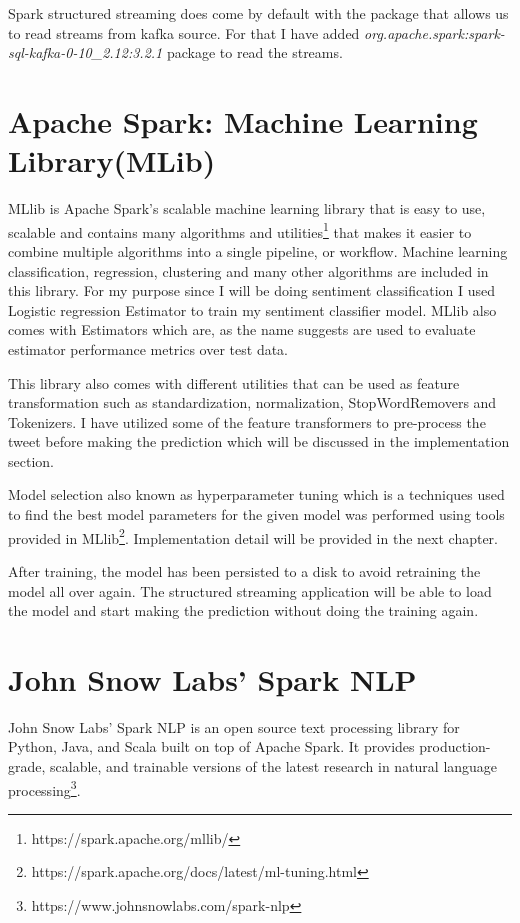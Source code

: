 \documentclass[12pt,a4paper]{report}
\begin{document}
Spark structured streaming does come by default with the package that allows us to read streams from kafka source. For that I have added \textit{org.apache.spark:spark-sql-kafka-0-10\_2.12:3.2.1} package to read the streams.
\section{Apache Spark: Machine Learning Library(MLib)}
MLlib is Apache Spark's scalable machine learning library that is easy to use, scalable and contains many algorithms and utilities\footnote{https://spark.apache.org/mllib/} that makes it easier to combine multiple algorithms into a single pipeline, or workflow. Machine learning classification, regression, clustering and many other algorithms are included in this library. For my purpose since I will be doing sentiment classification I used Logistic regression Estimator to train my sentiment classifier model. MLlib also comes with Estimators which are, as the name suggests are used to evaluate estimator performance metrics over test data.

This library also comes with different utilities that can be used as feature transformation such as standardization, normalization, StopWordRemovers and Tokenizers. I have utilized some of the feature transformers to pre-process the tweet before making the prediction which will be discussed in the implementation section.

Model selection also known as hyperparameter tuning which is a techniques used to find the best model parameters for the given model was performed using tools provided in MLlib\footnote{https://spark.apache.org/docs/latest/ml-tuning.html}. Implementation detail will be provided in the next chapter.

After training, the model has been persisted to a disk to avoid retraining the model all over again. The structured streaming application will be able to load the model and start making the prediction without doing the training again.

\section{John Snow Labs' Spark NLP}

John Snow Labs' Spark NLP is an open source text processing library for Python, Java, and Scala built on top of Apache Spark. It provides production-grade, scalable, and trainable versions of the latest research in natural language processing\footnote{https://www.johnsnowlabs.com/spark-nlp}.\\
\end{document}
